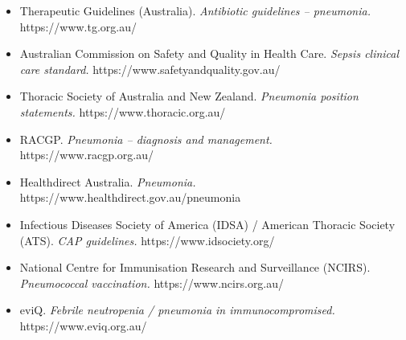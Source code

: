 \begin{itemize}
    \item Therapeutic Guidelines (Australia). \textit{Antibiotic guidelines -- pneumonia.} https://www.tg.org.au/
    \item Australian Commission on Safety and Quality in Health Care. \textit{Sepsis clinical care standard.} https://www.safetyandquality.gov.au/
    \item Thoracic Society of Australia and New Zealand. \textit{Pneumonia position statements.} https://www.thoracic.org.au/
    \item RACGP. \textit{Pneumonia -- diagnosis and management.} https://www.racgp.org.au/
    \item Healthdirect Australia. \textit{Pneumonia.} https://www.healthdirect.gov.au/pneumonia
    \item Infectious Diseases Society of America (IDSA) / American Thoracic Society (ATS). \textit{CAP guidelines.} https://www.idsociety.org/
    \item National Centre for Immunisation Research and Surveillance (NCIRS). \textit{Pneumococcal vaccination.} https://www.ncirs.org.au/
    \item eviQ. \textit{Febrile neutropenia / pneumonia in immunocompromised.} https://www.eviq.org.au/
\end{itemize}